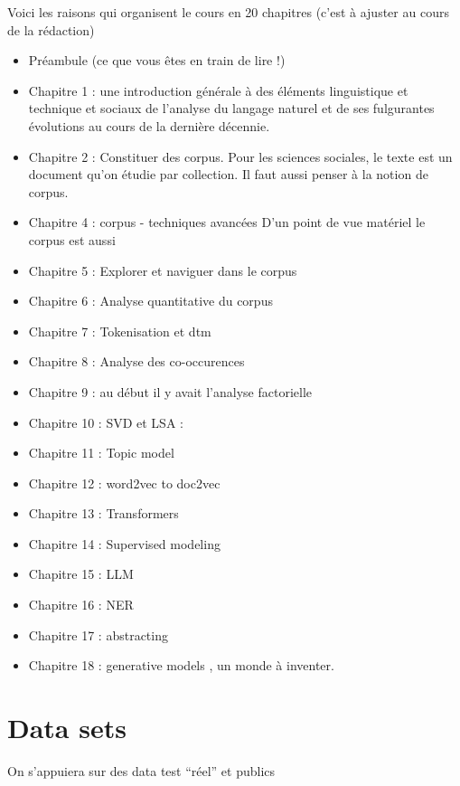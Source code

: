 \documentclass[
  letterpaper,
  DIV=11,
  numbers=noendperiod]{scrreprt}
\begin{document}
Voici les raisons qui organisent le cours en 20 chapitres (c'est à
ajuster au cours de la rédaction)

\begin{itemize}
\item
  Préambule (ce que vous êtes en train de lire !)
\item
  Chapitre 1 : une introduction générale à des éléments linguistique et
  technique et sociaux de l'analyse du langage naturel et de ses
  fulgurantes évolutions au cours de la dernière décennie.
\item
  Chapitre 2 : Constituer des corpus. Pour les sciences sociales, le
  texte est un document qu'on étudie par collection. Il faut aussi
  penser à la notion de corpus.
\item
  Chapitre 4 : corpus - techniques avancées D'un point de vue matériel
  le corpus est aussi
\item
  Chapitre 5 : Explorer et naviguer dans le corpus
\item
  Chapitre 6 : Analyse quantitative du corpus
\item
  Chapitre 7 : Tokenisation et dtm
\item
  Chapitre 8 : Analyse des co-occurences
\item
  Chapitre 9 : au début il y avait l'analyse factorielle
\item
  Chapitre 10 : SVD et LSA :
\item
  Chapitre 11 : Topic model
\item
  Chapitre 12 : word2vec to doc2vec
\item
  Chapitre 13 : Transformers
\item
  Chapitre 14 : Supervised modeling
\item
  Chapitre 15 : LLM
\item
  Chapitre 16 : NER
\item
  Chapitre 17 : abstracting
\item
  Chapitre 18 : generative models , un monde à inventer.
\end{itemize}

\section*{Data sets}\label{data-sets}


On s'appuiera sur des data test ``réel'' et publics
\end{document}
